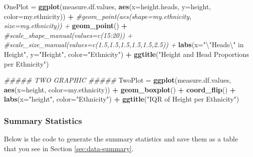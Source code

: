 \documentclass[]{article}
\newenvironment{Shaded}{\begin{snugshade}}{\end{snugshade}}
\newcommand{\CharTok}[1]{\textcolor[rgb]{0.31,0.60,0.02}{#1}}
\newcommand{\CommentTok}[1]{\textcolor[rgb]{0.56,0.35,0.01}{\textit{#1}}}
\newcommand{\DataTypeTok}[1]{\textcolor[rgb]{0.13,0.29,0.53}{#1}}
\newcommand{\KeywordTok}[1]{\textcolor[rgb]{0.13,0.29,0.53}{\textbf{#1}}}
\newcommand{\NormalTok}[1]{#1}
\newcommand{\OperatorTok}[1]{\textcolor[rgb]{0.81,0.36,0.00}{\textbf{#1}}}
\newcommand{\StringTok}[1]{\textcolor[rgb]{0.31,0.60,0.02}{#1}}
\begin{document}
\begin{Shaded}
\begin{Highlighting}[]
\NormalTok{OnePlot =}\StringTok{ }\KeywordTok{ggplot}\NormalTok{(measure.df.values, }\KeywordTok{aes}\NormalTok{(}\DataTypeTok{x=}\NormalTok{height.heads, }\DataTypeTok{y=}\NormalTok{height, }\DataTypeTok{color=}\NormalTok{my.ethnicity)) }\OperatorTok{+}
\StringTok{  }\CommentTok{#geom_point(aes(shape=my.ethnicity, size=my.ethnicity)) +}
\StringTok{  }\KeywordTok{geom_point}\NormalTok{() }\OperatorTok{+}
\StringTok{  }\CommentTok{#scale_shape_manual(values=c(15:20)) +}
\StringTok{  }\CommentTok{#scale_size_manual(values=c(1.5,1.5,1.5,1.5,1.5,2.5)) +}
\StringTok{  }\KeywordTok{labs}\NormalTok{(}\DataTypeTok{x=}\StringTok{"}\CharTok{\textbackslash{}"}\StringTok{Heads}\CharTok{\textbackslash{}"}\StringTok{ in Height"}\NormalTok{, }\DataTypeTok{y=}\StringTok{"Height"}\NormalTok{, }\DataTypeTok{color=}\StringTok{"Ethnicity"}\NormalTok{) }\OperatorTok{+}
\StringTok{  }\KeywordTok{ggtitle}\NormalTok{(}\StringTok{"Height and Head Proportions per Ethnicity"}\NormalTok{)}


\CommentTok{##### TWO GRAPHIC #####}
\NormalTok{TwoPlot =}\StringTok{ }\KeywordTok{ggplot}\NormalTok{(measure.df.values, }\KeywordTok{aes}\NormalTok{(}\DataTypeTok{x=}\NormalTok{height, }\DataTypeTok{color=}\NormalTok{my.ethnicity)) }\OperatorTok{+}
\StringTok{  }\KeywordTok{geom_boxplot}\NormalTok{() }\OperatorTok{+}
\StringTok{  }\KeywordTok{coord_flip}\NormalTok{() }\OperatorTok{+}
\StringTok{  }\KeywordTok{labs}\NormalTok{(}\DataTypeTok{x=}\StringTok{"height"}\NormalTok{, }\DataTypeTok{color=}\StringTok{"Ethnicity"}\NormalTok{) }\OperatorTok{+}
\StringTok{  }\KeywordTok{ggtitle}\NormalTok{(}\StringTok{"IQR of Height per Ethnicity"}\NormalTok{)}
\end{Highlighting}
\end{Shaded}

\subsubsection{Summary Statistics}
\label{sec:appendix-setup4}

Below is the code to generate the summary statistics and save them as a
table that you see in Section \ref{sec:data-summary}.
\end{document}

